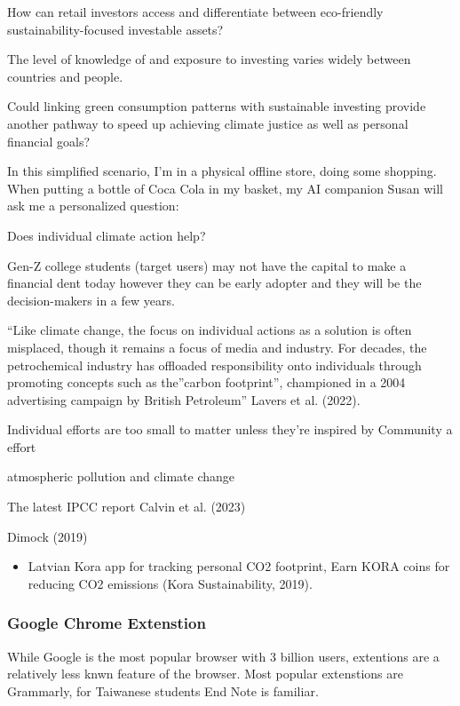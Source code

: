 \documentclass[
  letterpaper,
  DIV=11,
  numbers=noendperiod]{scrartcl}
\providecommand{\tightlist}{%
  \setlength{\itemsep}{0pt}\setlength{\parskip}{0pt}}\usepackage{longtable,booktabs,array}
\begin{document}
How can retail investors access and differentiate between eco-friendly
sustainability-focused investable assets?

The level of knowledge of and exposure to investing varies widely
between countries and people.

Could linking green consumption patterns with sustainable investing
provide another pathway to speed up achieving climate justice as well as
personal financial goals?

In this simplified scenario, I'm in a physical offline store, doing some
shopping. When putting a bottle of Coca Cola in my basket, my AI
companion Susan will ask me a personalized question:

Does individual climate action help?

Gen-Z college students (target users) may not have the capital to make a
financial dent today however they can be early adopter and they will be
the decision-makers in a few years.

``Like climate change, the focus on individual actions as a solution is
often misplaced, though it remains a focus of media and industry. For
decades, the petrochemical industry has offloaded responsibility onto
individuals through promoting concepts such as the''carbon footprint'',
championed in a 2004 advertising campaign by British Petroleum'' Lavers
et al. (2022).

Individual efforts are too small to matter unless they're inspired by
Community a effort

atmospheric pollution and climate change

The latest IPCC report Calvin et al. (2023)

Dimock (2019)

\begin{itemize}
\tightlist
\item
  Latvian Kora app for tracking personal CO2 footprint, Earn KORA coins
  for reducing CO2 emissions (Kora Sustainability, 2019).
\end{itemize}

\subsubsection{Google Chrome Extenstion}\label{google-chrome-extenstion}

While Google is the most popular browser with 3 billion users,
extentions are a relatively less knwn feature of the browser. Most
popular extenstions are Grammarly, for Taiwanese students End Note is
familiar.
\end{document}

